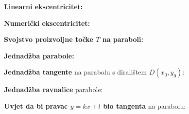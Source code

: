 \documentclass[9pt,oneside,a4paper]{report}
\begin{document}
\vspace{1mm}
\noindent
\textbf{Linearni ekscentricitet:}\hspace{5mm}

\vspace{1mm}
\noindent
\textbf{Numeri\v{c}ki ekscentricitet:}
\hspace{5mm}

\begin{floatingfigure}[r]{6cm}
\end{floatingfigure}

\vspace{3mm}
\noindent
{}

\vspace{3mm}\noindent
\textbf{Svojstvo proizvoljne to\v{c}ke $T$ na paraboli:}\\
\hspace*{20mm}


\vspace{3mm}\noindent
\textbf{Jednad\v{z}ba parabole:}\\
\hspace*{20mm}

\vspace{3mm}\noindent
\noindent
\textbf{Jednad\v{z}ba tangente} na parabolu s dirali\v{s}tem
$D(x_0,y_0)$:\\
\hspace*{20mm}

\vspace{3mm}\noindent
\noindent
\textbf{Jednad\v{z}ba ravnalice} parabole:\hspace{3mm}

\vspace{1mm}
\noindent
\textbf{Uvjet da bi pravac $y=kx+l$ bio tangenta} na parabolu:
\hspace{5mm}

\hfill{}
\end{document}
